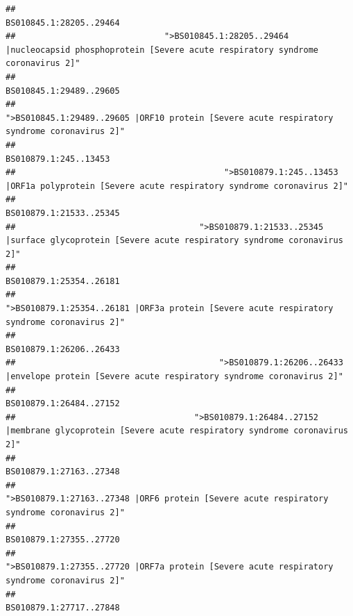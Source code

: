 \documentclass[
]{article}
\begin{document}
\begin{verbatim}
##                                                                                                                BS010845.1:28205..29464 
##                              ">BS010845.1:28205..29464 |nucleocapsid phosphoprotein [Severe acute respiratory syndrome coronavirus 2]" 
##                                                                                                                BS010845.1:29489..29605 
##                                            ">BS010845.1:29489..29605 |ORF10 protein [Severe acute respiratory syndrome coronavirus 2]" 
##                                                                                                                  BS010879.1:245..13453 
##                                          ">BS010879.1:245..13453 |ORF1a polyprotein [Severe acute respiratory syndrome coronavirus 2]" 
##                                                                                                                BS010879.1:21533..25345 
##                                     ">BS010879.1:21533..25345 |surface glycoprotein [Severe acute respiratory syndrome coronavirus 2]" 
##                                                                                                                BS010879.1:25354..26181 
##                                            ">BS010879.1:25354..26181 |ORF3a protein [Severe acute respiratory syndrome coronavirus 2]" 
##                                                                                                                BS010879.1:26206..26433 
##                                         ">BS010879.1:26206..26433 |envelope protein [Severe acute respiratory syndrome coronavirus 2]" 
##                                                                                                                BS010879.1:26484..27152 
##                                    ">BS010879.1:26484..27152 |membrane glycoprotein [Severe acute respiratory syndrome coronavirus 2]" 
##                                                                                                                BS010879.1:27163..27348 
##                                             ">BS010879.1:27163..27348 |ORF6 protein [Severe acute respiratory syndrome coronavirus 2]" 
##                                                                                                                BS010879.1:27355..27720 
##                                            ">BS010879.1:27355..27720 |ORF7a protein [Severe acute respiratory syndrome coronavirus 2]" 
##                                                                                                                BS010879.1:27717..27848 

\end{verbatim}
\end{document}
